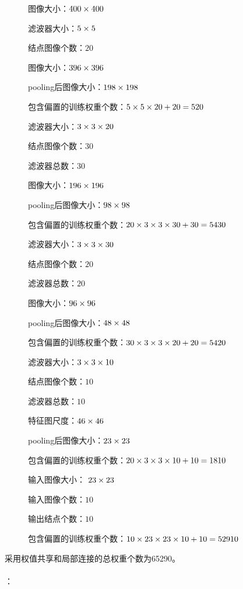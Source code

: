 \documentclass{article}
\begin{document}
\begin{description}
	\item [] 图像大小：${\rm{400}} \times {\rm{400}}$
	\item [] 
	
	滤波器大小：${\rm{5}} \times {\rm{5}}$

	结点图像个数：$20$

	图像大小：${\rm{396}} \times {\rm{396}}$
	
	pooling后图像大小：${\rm{198}} \times {\rm{198}}$
	
	包含偏置的训练权重个数：${\rm{5}} \times {\rm{5}} \times {\rm{20 + 20 = 520}}$

	\item [] 
	滤波器大小：${\rm{3}} \times {\rm{3}} \times {\rm{20}}$

	结点图像个数：$30$

	滤波器总数：$30$

	图像大小：${\rm{196}} \times {\rm{196}}$
	
	pooling后图像大小：${\rm{98}} \times {\rm{98}}$
	
	包含偏置的训练权重个数：${\rm{20}} \times {\rm{3}} \times {\rm{3}} \times {\rm{30 + 30 = 5430}}$
	
	\item[]	
	滤波器大小：${\rm{3}} \times {\rm{3}} \times {\rm{30}}$

	结点图像个数：$20$

	滤波器总数：$20$
	
	图像大小：${\rm{96}} \times {\rm{96}}$
	
	pooling后图像大小：${\rm{48}} \times {\rm{48}}$
	
	包含偏置的训练权重个数：${\rm{30}} \times {\rm{3}} \times {\rm{3}} \times {\rm{20 + 20 = 5420}}$
	
	\item[]
	滤波器大小：${\rm{3}} \times {\rm{3}} \times {\rm{10}}$

	结点图像个数：$10$

	滤波器总数：$10$

	特征图尺度：${\rm{46}} \times {\rm{46}}$
	
	pooling后图像大小：${\rm{23}} \times {\rm{23}}$
	
	包含偏置的训练权重个数：${\rm{20}} \times {\rm{3}} \times {\rm{3}} \times {\rm{10 + 10 = 1810}}$

	\item[]
	输入图像大小： ${\rm{23}} \times {\rm{23}}$

	输入图像个数：$10$

	输出结点个数：$10$
	
	包含偏置的训练权重个数：${\rm{10}} \times {\rm{23}} \times {\rm{23}} \times {\rm{10 + 10 = 52910}}$
\end{description}
采用权值共享和局部连接的总权重个数为65290。
\\\\
：
\end{document}
